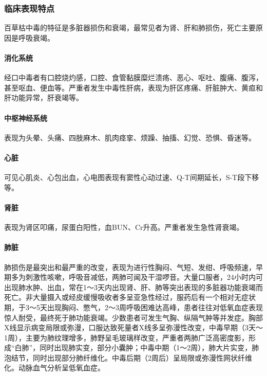 \subsubsection{临床表现特点}

百草枯中毒的特征是多脏器损伤和衰竭，最常见者为肾、肝和肺损伤，死亡主要原因是呼吸衰竭。

\paragraph{消化系统}

经口中毒者有口腔烧灼感，口腔、食管黏膜糜烂溃疡、恶心、呕吐、腹痛、腹泻，甚至呕血、便血等。严重者发生中毒性肝病，表现为肝区疼痛、肝脏肿大、黄疸和肝功能异常，肝衰竭等。

\paragraph{中枢神经系统}

表现为头晕、头痛、四肢麻木、肌肉痉挛、烦躁、抽搐、幻觉、恐惧、昏迷等。

\paragraph{心脏}

可见心肌炎、心包出血，心电图表现有窦性心动过速、Q-T间期延长，S-T段下移等。

\paragraph{肾脏}

表现为肾区叩痛，尿蛋白阳性，血BUN、Cr升高。严重者发生急性肾衰竭。

\paragraph{肺脏}

肺损伤是最突出和最严重的改变，表现为进行性胸闷、气短、发绀、呼吸频速，早期多为刺激性咳嗽，呼吸音减低，两肺可闻及干湿啰音。大量口服者，24小时内可出现肺水肿、出血，常在1～3天内出现肾、肝、肺等突出表现的多脏器功能衰竭而死亡。非大量摄入或经皮缓慢吸收者多呈亚急性经过，服药后有一个相对无症状期，于3～5天出现胸闷、憋气，2～3周呼吸困难达高峰，患者往往对低氧血症表现惊人耐受，最终死于肺功能衰竭。少数患者可发生气胸、纵隔气肿等并发症。胸部X线显示病变局限或弥漫，口服达致死量者X线多呈弥漫性改变，中毒早期（3天～1周），主要为肺纹理增多，肺野呈毛玻璃样改变，严重者两肺广泛高密度影，形成“白肺”，同时出现肺实变，部分小囊肿；中毒中期（1～2周），肺大片实变，肺泡结节，同时出现部分肺纤维化。中毒后期（2周后）呈局限或弥漫性网状纤维化。动脉血气分析呈低氧血症。

